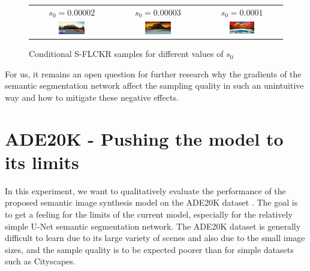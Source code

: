 \begin{figure}[] \label{fig:5.17}
    \setlength\tabcolsep{1pt}
    \centering
    \begin{tabular}{ccc}
        $s_0=0.00002$ & $s_0=0.00003$ & $s_0=0.0001$ \\
        \includegraphics[width=0.33\textwidth]{Chapters/figures/experiments/flickr/flickr_sample_1.PNG} & \includegraphics[width=0.33\textwidth]{Chapters/figures/experiments/flickr/2_sample.png} &
        \includegraphics[width=0.33\textwidth]{Chapters/figures/experiments/flickr/1_sample.png}
    \end{tabular}
    \caption{Conditional S-FLCKR samples for different values of $s_0$}
\end{figure}

For us, it remains an open question for further research why the gradients of the semantic segmentation network affect the sampling quality in such an unintuitive way and how to mitigate these negative effects.

\section[ADE20K - Pushing the model to its limits]{ADE20K - Pushing the model to its limits%
    } \label{sec:5.6}
In this experiment, we want to qualitatively evaluate the performance of the proposed semantic image synthesis model on the ADE20K dataset \cite{ade20k}. The goal is to get a feeling for the limits of the current model, especially for the relatively simple U-Net semantic segmentation network. The ADE20K dataset is generally difficult to learn due to its large variety of scenes and also due to the small image sizes, and the sample quality is to be expected poorer than for simple datasets such as Cityscapes. 
%
